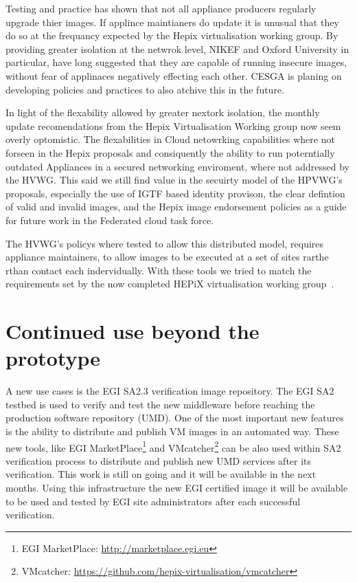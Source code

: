 \documentclass{llncs_Ibergrid2013}
\begin{document}
Testing and practice has shown that not all appliance producers regularly upgrade thier images. If applince maintianers do update it is unusual that they do so at the frequancy expected by the Hepix virtualisation working group. By providing greater isolation at the netwrok level, NIKEF and Oxford University in particular, have long suggested that they are capable of running insecure images, without fear of applinaces negatively effecting each other. CESGA is planing on developing policies and practices to also atchive this in the future. 

In light of the flexability allowed by greater nextork isolation, the monthly update recomendations from the Hepix Virtualisation Working group now seem overly optomistic. The flexabilities in Cloud netowrking capabilities where not forseen in the Hepix proposals and consiquently the ability to run poterntially outdated Appliances in a secured networking enviroment, where not addressed by the HVWG. This said we still find value in the secuirty model of the HPVWG's proposals, especially the use of IGTF based identity provison, the clear defintion of valid and invalid images, and the Hepix image endorsement policies as a guide for future work in the Federated cloud task force.

The HVWG's policys where tested to allow this distributed model, requires appliance maintainers, to allow images to be executed at a set of sites rarthe rthan contact each indervidually. With these tools we tried to match the requirements set by the now completed HEPiX virtualisation working group~\cite{hepix}.

\section{Continued use beyond the prototype}
\label{sect-experiances}


A new use cases is the EGI SA2.3 verification image repository. The EGI SA2 testbed is used to verify and test the new middleware before reaching the production software repository (UMD).
One of the most important new features is the ability to distribute and publish VM images in an automated way. 
These new tools, like EGI MarketPlace\footnote{EGI MarketPlace: \url{http://marketplace.egi.eu}} and VMcatcher\footnote{VMcatcher: \url{https://github.com/hepix-virtualisation/vmcatcher}} can be also used within SA2 verification process to distribute and publish new UMD services after its verification. 
This work is still on going and it will be available in the next months. Using this infrastructure the new EGI certified image it will be available to be used and tested by EGI site administrators after each successful verification.
\end{document}
